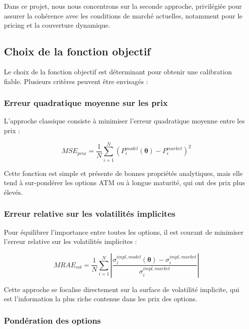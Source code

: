 Dans ce projet, nous nous concentrons sur la seconde approche, privilégiée pour assurer la cohérence avec les conditions de marché actuelles, notamment pour le pricing et la couverture dynamique.

\subsection{Choix de la fonction objectif}

Le choix de la fonction objectif est déterminant pour obtenir une calibration fiable. Plusieurs critères peuvent être envisagés :

\subsubsection{Erreur quadratique moyenne sur les prix}

L'approche classique consiste à minimiser l'erreur quadratique moyenne entre les prix :

\begin{equation}
	MSE_{prix} = \frac{1}{N}\sum_{i=1}^{N} \left( P^{model}_i(\boldsymbol{\theta}) - P^{market}_i \right)^2
\end{equation}

Cette fonction est simple et présente de bonnes propriétés analytiques, mais elle tend à sur-pondérer les options ATM ou à longue maturité, qui ont des prix plus élevés.

\subsubsection{Erreur relative sur les volatilités implicites}

Pour équilibrer l'importance entre toutes les options, il est courant de minimiser l'erreur relative sur les volatilités implicites :

\begin{equation}
	MRAE_{vol} = \frac{1}{N} \sum_{i=1}^{N} \left| \frac{\sigma^{impl,model}_i(\boldsymbol{\theta}) - \sigma^{impl,market}_i}{\sigma^{impl,market}_i} \right|
\end{equation}

Cette approche se focalise directement sur la surface de volatilité implicite, qui est l'information la plus riche contenue dans les prix des options.

\subsubsection{Pondération des options}

